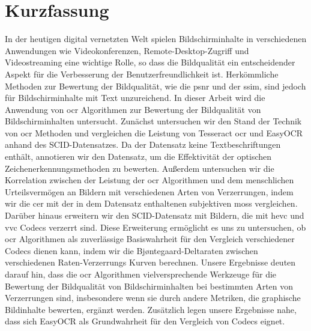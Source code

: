 \chapter{Kurzfassung}

In der heutigen digital vernetzten Welt spielen Bildschirminhalte in verschiedenen Anwendungen wie Videokonferenzen, Remote-Desktop-Zugriff und Videostreaming eine wichtige Rolle, so dass die Bildqualität ein entscheidender Aspekt für die Verbesserung der Benutzerfreundlichkeit ist.
Herkömmliche Methoden zur Bewertung der Bildqualität, wie die \gls{psnr} und der \gls{ssim}, sind jedoch für Bildschirminhalte mit Text unzureichend.
In dieser Arbeit wird die Anwendung von \gls{ocr} Algorithmen zur Bewertung der Bildqualität von Bildschirminhalten untersucht.
Zunächst untersuchen wir den Stand der Technik von \gls{ocr} Methoden und vergleichen die Leistung von Tesseract \gls{ocr} und EasyOCR anhand des SCID-Datensatzes. 
Da der Datensatz keine Textbeschriftungen enthält, annotieren wir den Datensatz, um die Effektivität der optischen Zeichenerkennungsmethoden zu bewerten.
Außerdem untersuchen wir die Korrelation zwischen der Leistung der \gls{ocr} Algorithmen und dem menschlichen Urteilsvermögen an Bildern mit verschiedenen Arten von Verzerrungen, indem wir die \gls{cer} mit der in dem Datensatz enthaltenen subjektiven \glspl{mos} vergleichen.
Darüber hinaus erweitern wir den SCID-Datensatz mit Bildern, die mit \gls{hevc} und \gls{vvc} Codecs verzerrt sind.
Diese Erweiterung ermöglicht es uns zu untersuchen, ob \gls{ocr} Algorithmen als zuverlässige Basiswahrheit für den Vergleich verschiedener Codecs dienen kann, indem wir die Bjøntegaard-Deltaraten zwischen verschiedenen Raten-Verzerrungs Kurven berechnen.
Unsere Ergebnisse deuten darauf hin, dass die \gls{ocr} Algorithmen vielversprechende Werkzeuge für die Bewertung der Bildqualität von Bildschirminhalten bei bestimmten Arten von Verzerrungen sind, insbesondere wenn sie durch andere Metriken, die graphische Bildinhalte bewerten, ergänzt werden.
Zusätzlich legen unsere Ergebnisse nahe, dass sich EasyOCR als Grundwahrheit für den Vergleich von Codecs eignet.

